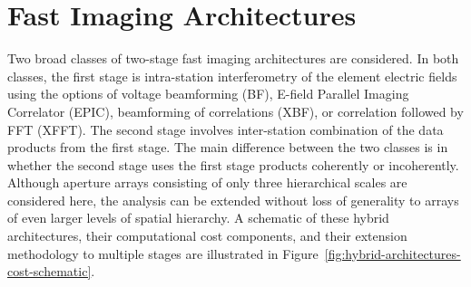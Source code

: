 \documentclass[
  journal=pasa,
  manuscript=article-type,
  year=2020,
  volume=37,
]{cup-journal}
\begin{document}
\section{Fast Imaging Architectures} \label{sec:img-archs}

Two broad classes of two-stage fast imaging architectures are considered. In both classes, the first stage is intra-station interferometry of the element electric fields using the options of voltage beamforming (BF), E-field Parallel Imaging Correlator (EPIC), beamforming of correlations (XBF), or correlation followed by FFT (XFFT). The second stage involves inter-station combination of the data products from the first stage. The main difference between the two classes is in whether the second stage uses the first stage products coherently or incoherently. Although aperture arrays consisting of only three hierarchical scales are considered here, the analysis can be extended without loss of generality to arrays of even larger levels of spatial hierarchy. A schematic of these hybrid architectures, their computational cost components, and their extension methodology to multiple stages are illustrated in Figure~\ref{fig:hybrid-architectures-cost-schematic}.
\end{document}
